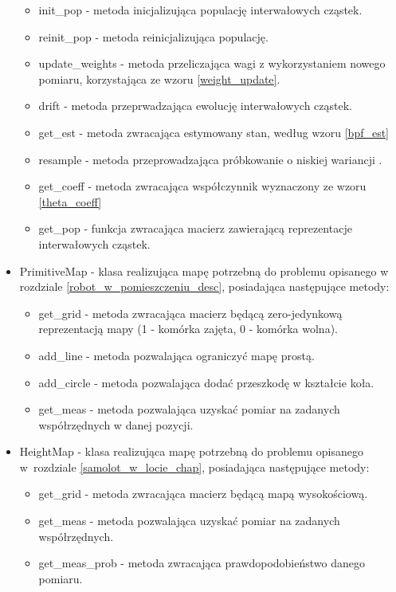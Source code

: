 \begin{itemize}
\begin{itemize}
		\item init\_pop - metoda inicjalizująca populację interwałowych cząstek.
		\item reinit\_pop - metoda reinicjalizująca populację.
		\item update\_weights - metoda przeliczająca wagi z wykorzystaniem nowego pomiaru, korzystająca ze wzoru \ref{weight_update}.
		\item drift - metoda przeprwadzająca ewolucję interwałowych cząstek.
		\item get\_est - metoda zwracająca estymowany stan, według wzoru \ref{bpf_est}
		\item resample - metoda przeprowadzająca próbkowanie o niskiej wariancji \cite{sus_wiki}.
		\item get\_coeff - metoda zwracająca współczynnik wyznaczony ze wzoru \ref{theta_coeff}
		\item get\_pop - funkcja zwracająca macierz zawierającą reprezentacje interwałowych cząstek.
	\end{itemize}
	\item PrimitiveMap - klasa realizująca mapę potrzebną do problemu opisanego w rozdziale \ref{robot_w_pomieszczeniu_desc}, posiadająca następujące metody:
	\begin{itemize}
		\item get\_grid - metoda zwracająca macierz będącą zero-jedynkową reprezentacją mapy (1 - komórka zajęta, 0 - komórka wolna).
		\item add\_line - metoda pozwalająca ograniczyć mapę prostą.
		\item add\_circle - metoda pozwalająca dodać przeszkodę w kształcie koła.
		\item get\_meas - metoda pozwalająca uzyskać pomiar na zadanych współrzędnych w danej pozycji.
	\end{itemize}

	\item HeightMap - klasa realizująca mapę potrzebną do problemu opisanego w~rozdziale \ref{samolot_w_locie_chap}, posiadająca następujące metody:
	\begin{itemize}
		\item get\_grid - metoda zwracająca macierz będącą mapą wysokościową.
		\item get\_meas - metoda pozwalająca uzyskać pomiar na zadanych współrzędnych.
		\item get\_meas\_prob - metoda zwracająca prawdopodobieństwo danego pomiaru.
	\end{itemize}
	
\end{itemize}

